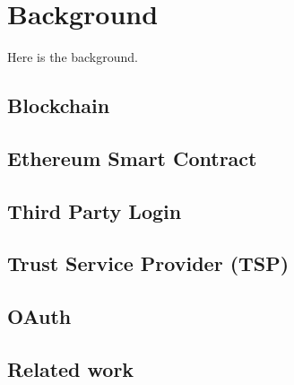 \chapter{Background}
\label{chapter:background}

Here is the background.

\section{Blockchain}

\section{Ethereum Smart Contract}

\section{Third Party Login}

\section{Trust Service Provider (TSP)}

\section{OAuth}

\section{Related work}
